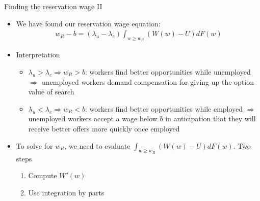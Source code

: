 \documentclass[9pt]{beamer}
\newcommand{\bit}{\begin{itemize}}
\newcommand{\eit}{\end{itemize}}
\newcommand{\ben}{\begin{enumerate}}
\newcommand{\een}{\end{enumerate}}
\newcommand{\lb}{\label}
\newcommand{\bc}{\color{blue}}
\begin{document}
\begin{frame}{Finding the reservation wage II}

\bit
\setlength\itemsep{2em}

\item We have found our {\bc reservation wage equation}:
\begin{eqnarray}
\lb{bm_reservation_wage}
w_R-b = (\lambda_u-\lambda_e) \int_{w \geq w_R} (W(w)-U) dF(w)
\end{eqnarray}

\item Interpretation
\bit
\setlength\itemsep{0.5em}

\item $\lambda_u>\lambda_e \Rightarrow w_R>b$: workers find better opportunities while unemployed $\Rightarrow$ unemployed workers demand compensation for giving up the option value of search

\item $\lambda_u<\lambda_e \Rightarrow w_R<b$: workers find better opportunities while employed $\Rightarrow$ unemployed workers accept a wage below $b$ in anticipation that they will receive better offers more quickly once employed
\eit
%

\item To solve for $w_R$, we need to evaluate $\int_{w \geq w_R} (W(w)-U) dF(w)$. Two steps
\ben
\setlength\itemsep{0.5em}
	\item Compute $W'(w)$
	
	\item Use integration by parts
\een

\eit

\end{frame}
\end{document}
